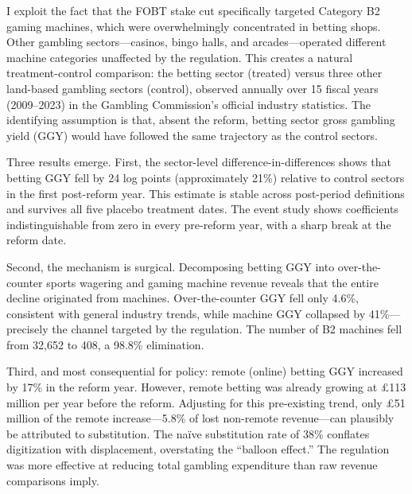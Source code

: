 \documentclass[12pt]{article}
\begin{document}
I exploit the fact that the FOBT stake cut specifically targeted Category B2 gaming machines, which were overwhelmingly concentrated in betting shops. Other gambling sectors---casinos, bingo halls, and arcades---operated different machine categories unaffected by the regulation. This creates a natural treatment-control comparison: the betting sector (treated) versus three other land-based gambling sectors (control), observed annually over 15 fiscal years (2009--2023) in the Gambling Commission's official industry statistics. The identifying assumption is that, absent the reform, betting sector gross gambling yield (GGY) would have followed the same trajectory as the control sectors.

Three results emerge. First, the sector-level difference-in-differences shows that betting GGY fell by 24 log points (approximately 21\%) relative to control sectors in the first post-reform year. This estimate is stable across post-period definitions and survives all five placebo treatment dates. The event study shows coefficients indistinguishable from zero in every pre-reform year, with a sharp break at the reform date.

Second, the mechanism is surgical. Decomposing betting GGY into over-the-counter sports wagering and gaming machine revenue reveals that the entire decline originated from machines. Over-the-counter GGY fell only 4.6\%, consistent with general industry trends, while machine GGY collapsed by 41\%---precisely the channel targeted by the regulation. The number of B2 machines fell from 32,652 to 408, a 98.8\% elimination.

Third, and most consequential for policy: remote (online) betting GGY increased by 17\% in the reform year. However, remote betting was already growing at \pounds 113 million per year before the reform. Adjusting for this pre-existing trend, only \pounds 51 million of the remote increase---5.8\% of lost non-remote revenue---can plausibly be attributed to substitution. The na\"ive substitution rate of 38\% conflates digitization with displacement, overstating the ``balloon effect.'' The regulation was more effective at reducing total gambling expenditure than raw revenue comparisons imply.
\end{document}
